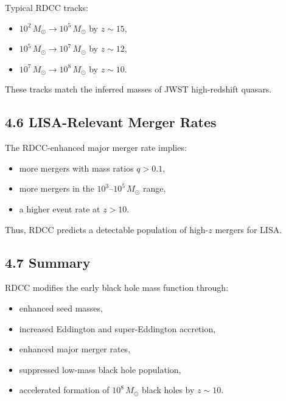 \documentclass[11pt,a4paper]{article}
\begin{document}
Typical RDCC tracks:

\begin{itemize}
    \item $10^{2}\,M_{\odot} \rightarrow 10^{5}\,M_{\odot}$ by $z \sim 15$,
    \item $10^{5}\,M_{\odot} \rightarrow 10^{7}\,M_{\odot}$ by $z \sim 12$,
    \item $10^{7}\,M_{\odot} \rightarrow 10^{8}\,M_{\odot}$ by $z \sim 10$.
\end{itemize}

These tracks match the inferred masses of JWST high-redshift quasars.

\subsection*{4.6 LISA-Relevant Merger Rates}

The RDCC-enhanced major merger rate implies:

\begin{itemize}
    \item more mergers with mass ratios $q > 0.1$,
    \item more mergers in the $10^{3}$–$10^{5}\,M_{\odot}$ range,
    \item a higher event rate at $z > 10$.
\end{itemize}

Thus, RDCC predicts a detectable population of high-$z$ mergers for LISA.

\subsection*{4.7 Summary}

RDCC modifies the early black hole mass function through:

\begin{itemize}
    \item enhanced seed masses,
    \item increased Eddington and super-Eddington accretion,
    \item enhanced major merger rates,
    \item suppressed low-mass black hole population,
    \item accelerated formation of $10^{8}\,M_{\odot}$ black holes by $z \sim 10$.
\end{itemize}
\end{document}
